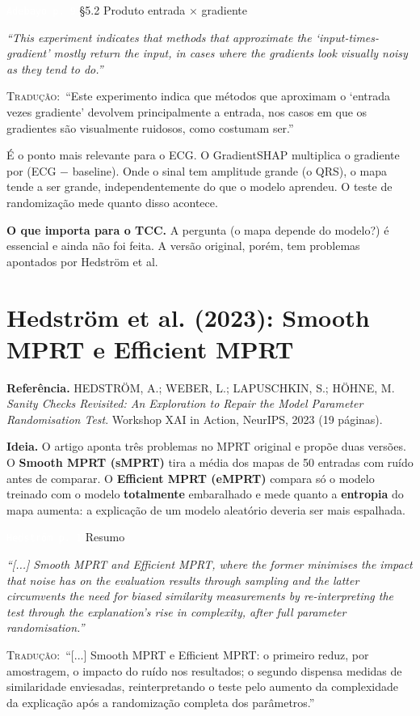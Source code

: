 \documentclass[11pt,a4paper]{article}
\newcommand{\pagechip}[1]{{\setlength{\fboxsep}{1.5pt}\colorbox{cAcc}{\textcolor{white}{\scriptsize\texttt{#1}}}}}
\newenvironment{origquote}{\par\itshape\small}{\par}
\newenvironment{tradquote}{\par\small\textsc{Tradução:}\ }{\par}
\newcommand{\explab}[1]{\par\smallskip{\small\color{cAcc}\textbf{\MakeUppercase{#1}}}\par}
\begin{document}
\begin{citacard}{\pagechip{Adebayo p. 9} §5.2 Produto entrada $\times$ gradiente}
\begin{origquote}“This experiment indicates that methods that approximate the ‘input-times-gradient’ mostly return the input, in cases where the gradients look visually noisy as they tend to do.”\end{origquote}
\begin{tradquote}“Este experimento indica que métodos que aproximam o ‘entrada vezes gradiente’ devolvem principalmente a entrada, nos casos em que os gradientes são visualmente ruidosos, como costumam ser.”\end{tradquote}
\explab{Explicação}
É o ponto mais relevante para o ECG. O GradientSHAP multiplica o gradiente por (ECG $-$ baseline). Onde o sinal tem amplitude grande (o QRS), o mapa tende a ser grande, independentemente do que o modelo aprendeu. O teste de randomização mede quanto disso acontece.
\end{citacard}

\textbf{O que importa para o TCC.} A pergunta (o mapa depende do modelo?) é essencial e ainda não foi feita. A versão original, porém, tem problemas apontados por Hedström et al.

\section{Hedström et al. (2023): Smooth MPRT e Efficient MPRT}
\textbf{Referência.} HEDSTRÖM, A.; WEBER, L.; LAPUSCHKIN, S.; HÖHNE, M. \textit{Sanity Checks Revisited: An Exploration to Repair the Model Parameter Randomisation Test}. Workshop XAI in Action, NeurIPS, 2023 (19 páginas).

\textbf{Ideia.} O artigo aponta três problemas no MPRT original e propõe duas versões. O \textbf{Smooth MPRT (sMPRT)} tira a média dos mapas de 50 entradas com ruído antes de comparar. O \textbf{Efficient MPRT (eMPRT)} compara só o modelo treinado com o modelo \textbf{totalmente} embaralhado e mede quanto a \textbf{entropia} do mapa aumenta: a explicação de um modelo aleatório deveria ser mais espalhada.

\begin{citacard}{\pagechip{Hedström p. 1} Resumo}
\begin{origquote}“[...] Smooth MPRT and Efficient MPRT, where the former minimises the impact that noise has on the evaluation results through sampling and the latter circumvents the need for biased similarity measurements by re-interpreting the test through the explanation's rise in complexity, after full parameter randomisation.”\end{origquote}
\begin{tradquote}“[...] Smooth MPRT e Efficient MPRT: o primeiro reduz, por amostragem, o impacto do ruído nos resultados; o segundo dispensa medidas de similaridade enviesadas, reinterpretando o teste pelo aumento da complexidade da explicação após a randomização completa dos parâmetros.”\end{tradquote}
\end{citacard}
\end{document}
